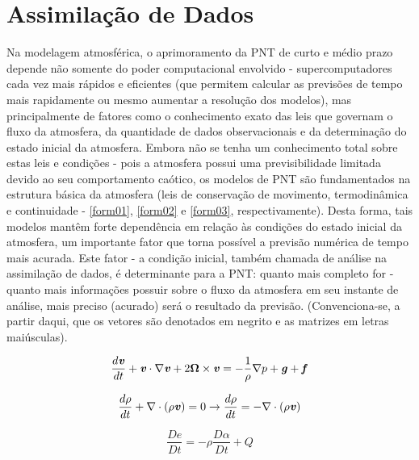 \section{Assimilação de Dados}
\label{ss:assimdados}

Na modelagem atmosférica, o aprimoramento da PNT de curto e médio prazo depende não somente do poder computacional envolvido - supercomputadores cada vez mais rápidos e eficientes (que permitem calcular as previsões de tempo mais rapidamente ou mesmo aumentar a resolução dos modelos), mas principalmente de fatores como o conhecimento exato das leis que governam o fluxo da atmosfera, da quantidade de dados observacionais e da determinação do estado inicial da atmosfera.  Embora não se tenha um conhecimento total sobre estas leis e condições - pois a atmosfera possui uma previsibilidade limitada devido ao seu comportamento caótico, os modelos de PNT são fundamentados na estrutura básica da atmosfera (leis de conservação de movimento, termodinâmica e continuidade - \autoref{form01}, \autoref{form02} e \autoref{form03}, respectivamente). Desta forma, tais modelos mantêm forte dependência em relação às condições do estado inicial da atmosfera, um importante fator que torna possível a previsão numérica de tempo mais acurada. Este fator - a condição inicial, também chamada de análise na assimilação de dados, é determinante para a PNT: quanto mais completo for - quanto mais informações possuir sobre o fluxo da atmosfera em seu instante de análise, mais preciso (acurado) será o resultado da previsão. (Convenciona-se, a partir daqui, que os vetores são denotados em negrito e as matrizes em letras maiúsculas).

\begin{equation}
\frac{d\textbf{\textit{v}}}{dt}+\textbf{\textit{v}}\cdot\nabla\textbf{\textit{v}}+2\mathbf{\Omega}\times\textbf{\textit{v}}=-\frac{1}{\rho}\nabla{p}+\textbf{\textit{g}}+\textbf{\textit{f}}
\label{form01}
\end{equation}

\begin{equation}
\frac{d\rho}{dt}+\nabla\cdot(\rho\textbf{\textit{v}})=0\rightarrow\frac{d\rho}{dt}=-\nabla\cdot(\rho\textbf{\textit{v}})
\label{form02}
\end{equation}

\begin{equation}
\frac{D\textit{e}}{D\textit{t}}=-\rho\frac{D\alpha}{D\textit{t}}+\textit{Q}
\label{form03}
\end{equation}

